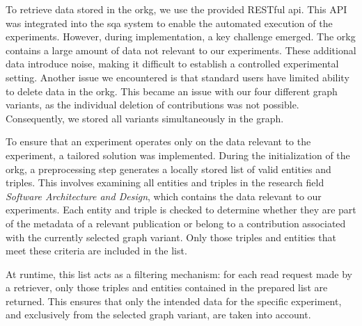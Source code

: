 To retrieve data stored in the \gls{orkg}, we use the provided RESTful \gls{api}. This API was integrated into the \gls{sqa} system to enable the automated execution of the experiments. However, during implementation, a key challenge emerged. The \gls{orkg} contains a large amount of data not relevant to our experiments. These additional data introduce noise, making it difficult to establish a controlled experimental setting. Another issue we encountered is that standard users have limited ability to delete data in the \gls{orkg}. This became an issue with our four different graph variants, as the individual deletion of contributions was not possible. Consequently, we stored all variants simultaneously in the graph.

To ensure that an experiment operates only on the data relevant to the experiment, a tailored solution was implemented. During the initialization of the \gls{orkg}, a preprocessing step generates a locally stored list of valid entities and triples. This involves examining all entities and triples in the research field \emph{Software Architecture and Design}, which contains the data relevant to our experiments. Each entity and triple is checked to determine whether they are part of the metadata of a relevant publication or belong to a contribution associated with the currently selected graph variant. Only those triples and entities that meet these criteria are included in the list.

At runtime, this list acts as a filtering mechanism: for each read request made by a retriever, only those triples and entities contained in the prepared list are returned. This ensures that only the intended data for the specific experiment, and exclusively from the selected graph variant, are taken into account.
